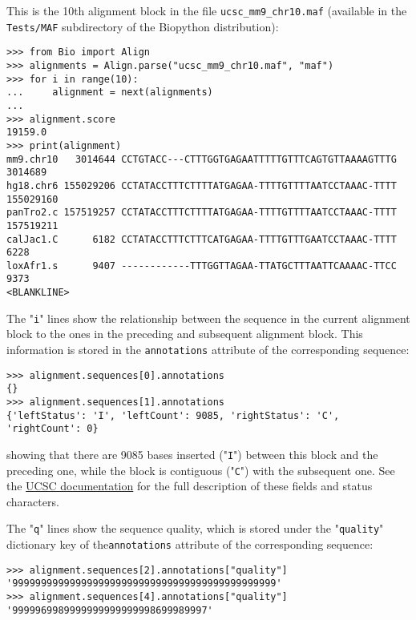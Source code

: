 This is the 10th alignment block in the file \verb|ucsc_mm9_chr10.maf| (available in the \verb|Tests/MAF| subdirectory of the Biopython distribution):
\begin{verbatim}
>>> from Bio import Align
>>> alignments = Align.parse("ucsc_mm9_chr10.maf", "maf")
>>> for i in range(10):
...     alignment = next(alignments)
...
>>> alignment.score
19159.0
>>> print(alignment)
mm9.chr10   3014644 CCTGTACC---CTTTGGTGAGAATTTTTGTTTCAGTGTTAAAAGTTTG   3014689
hg18.chr6 155029206 CCTATACCTTTCTTTTATGAGAA-TTTTGTTTTAATCCTAAAC-TTTT 155029160
panTro2.c 157519257 CCTATACCTTTCTTTTATGAGAA-TTTTGTTTTAATCCTAAAC-TTTT 157519211
calJac1.C      6182 CCTATACCTTTCTTTCATGAGAA-TTTTGTTTGAATCCTAAAC-TTTT      6228
loxAfr1.s      9407 ------------TTTGGTTAGAA-TTATGCTTTAATTCAAAAC-TTCC      9373
<BLANKLINE>
\end{verbatim}

The "\verb|i|" lines show the relationship between the sequence in the current alignment block to the ones in the preceding and subsequent alignment block. This information is stored in the \verb|annotations| attribute of the corresponding sequence:
\begin{verbatim}
>>> alignment.sequences[0].annotations
{}
>>> alignment.sequences[1].annotations
{'leftStatus': 'I', 'leftCount': 9085, 'rightStatus': 'C', 'rightCount': 0}
\end{verbatim}
showing that there are 9085 bases inserted ("\verb|I|") between this block and the preceding one, while the block is contiguous ("\verb|C|") with the subsequent one.  See the \href{https://genome.ucsc.edu/FAQ/FAQformat.html#format5}{UCSC documentation} for the full description of these fields and status characters.

The "\verb|q|" lines show the sequence quality, which is stored under the "\verb|quality|" dictionary key of the\verb|annotations| attribute of the corresponding sequence:
\begin{verbatim}
>>> alignment.sequences[2].annotations["quality"]
'9999999999999999999999999999999999999999999999'
>>> alignment.sequences[4].annotations["quality"]
'9999969989999999999999998699989997'
\end{verbatim}

